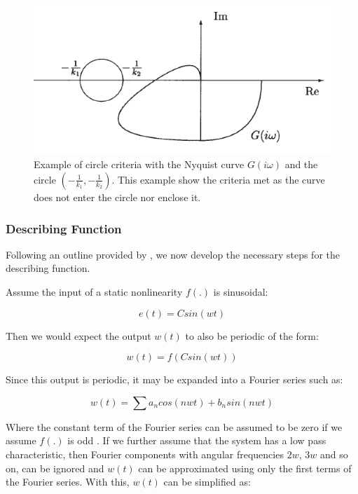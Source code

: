 \documentclass[a4paper, titlepage]{article}
\begin{document}
\begin{figure}[h!]
\center
\includegraphics[scale=1]{../figures/circleExample.png}
\caption{Example of circle criteria with the Nyquist curve $G(i\omega)$ and the circle $\left(-\frac{1}{k_1}, -\frac{1}{k_2}\right)$. This example show the criteria met as the curve does not enter the circle nor enclose it. \citep[~p.333]{glad00}}
\label{fig:cirEx}
\end{figure}



\subsubsection{Describing Function}
Following an outline provided by \citep{pates21}, we now develop the necessary steps for the describing function.

Assume the input of a static nonlinearity $f(.)$ is sinusoidal:

\begin{equation}
	e(t) = Csin(wt)
	\label{equ:input_e}
\end{equation}

Then we would expect the output $w(t)$ to also be periodic of the form:

\begin{equation}
	w(t) = f(Csin(wt))
\end{equation}

Since this output is periodic, it may be expanded into a Fourier series such as:

\begin{equation}
	w(t) = \sum{a_{n}cos(nwt)+b_{n}sin(nwt)}
\end{equation}

Where the constant term of the Fourier series can be assumed to be zero if we assume $f(.)$ is odd \citep[p. 358]{glad00}.  If we further assume that the system has a low pass characteristic, then Fourier components with angular frequencies $2w$, $3w$ and so on, can be ignored and $w(t)$ can be approximated using only the first terms of the Fourier series.  With this, $w(t)$ can be simplified as:
\end{document}
